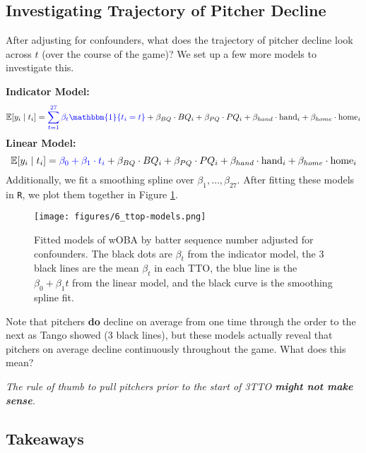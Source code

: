\documentclass[twoside]{article}
\theoremstyle{definition}
\begin{document}
\subsection{Investigating Trajectory of Pitcher Decline}

After adjusting for confounders, what does the \color{blue} trajectory \color{black} of pitcher decline look across $t$ (over the course of the game)? We set up a few more models to investigate this.

\textbf{Indicator Model:}
\begin{equation}
   \mathbb{E}[y_i \mid t_i] = \color{blue} \sum_{t=1}^{27} \beta_t \mathbbm{1}\{t_i = t\} \color{black} + \beta_{BQ} \cdot BQ_i + \beta_{PQ} \cdot PQ_i + \beta_{hand} \cdot \text{hand}_i + \beta_{home} \cdot \text{home}_i
\end{equation}
\textbf{Linear Model:}
\begin{equation}
   \mathbb{E}[y_i \mid t_i] = \color{blue} \beta_0 + \beta_1 \cdot t_i \color{black} + \beta_{BQ} \cdot BQ_i + \beta_{PQ} \cdot PQ_i + \beta_{hand} \cdot \text{hand}_i + \beta_{home} \cdot \text{home}_i
\end{equation}
Additionally, we fit a smoothing spline over $\beta_1, \hdots, \beta_{27}$. After fitting these models in \texttt{R}, we plot them together in Figure \ref{fig:ttop-models}.
\begin{figure}[H]
   \centering
   \texttt{[image: figures/6\_ttop-models.png]}
   \caption{Fitted models of wOBA by batter sequence number adjusted for confounders. The black dots are $\beta_t$ from the indicator model, the 3 black lines are the mean $\beta_t$ in each TTO, the blue line is the $\beta_0 + \beta_1 t$ from the linear model, and the black curve is the smoothing spline fit.}
   \label{fig:ttop-models}
\end{figure}
Note that pitchers \textbf{do} decline on average from one time through the order to the next as Tango showed (3 black lines), but these models actually reveal that pitchers on average \color{blue} decline continuously \color{black} throughout the game. What does this mean?

\color{red}
\textit{The rule of thumb to pull pitchers prior to the start of 3TTO \textbf{might not make sense}.}
\color{black}

\subsection{Takeaways}
\end{document}
